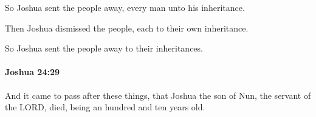 			\begin{versebox}
					\item[BHS] 
					\item[ASV] So Joshua sent the people away, every man unto his inheritance.
					\item[NIV] Then Joshua dismissed the people, each to their own inheritance.
					\item[NRSV] So Joshua sent the people away to their inheritances.
			\end{versebox}

		\paragraph{Joshua 24:29} %
			\label{JOSHUA-24-29}

			And it came to pass after these things, that Joshua the son of Nun, the servant of the LORD, died, being an hundred and ten years old.


